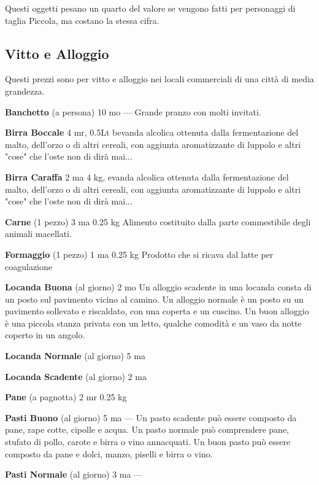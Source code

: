 \documentclass[a4paper,11pt,twoside,openany]{book}
\begin{document}
{Questi oggetti pesano un quarto del valore se vengono fatti per personaggi di taglia Piccola, ma costano la stessa cifra.

\pagebreak

\subsection{Vitto e Alloggio}

\label{vitto-e-alloggio}

Questi prezzi sono per vitto e alloggio nei locali commerciali di una città di media grandezza.

\textbf{Banchetto} (a persona) 10 mo --- Grande pranzo con molti invitati.

\textbf{Birra Boccale} 4 mr, 0.5Lt bevanda alcolica ottenuta dalla fermentazione del malto, dell'orzo o di altri cereali, con aggiunta aromatizzante di luppolo e altri "cose" che l'oste non di dirà mai...

\textbf{Birra Caraffa} 2 ma 4 kg, evanda alcolica ottenuta dalla fermentazione del malto, dell'orzo o di altri cereali, con aggiunta aromatizzante di luppolo e altri "cose" che l'oste non di dirà mai...

\textbf{Carne} (1 pezzo) 3 ma 0.25 kg Alimento costituito dalla parte commestibile degli animali macellati.

\textbf{Formaggio} (1 pezzo) 1 ma 0.25 kg Prodotto che si ricava dal latte per coagulazione

\textbf{Locanda Buona} (al giorno) 2 mo Un alloggio scadente in una locanda consta di un posto sul pavimento vicino al camino. Un alloggio normale è un posto su un pavimento sollevato e riscaldato, con una coperta e un cuscino. Un buon alloggio è una piccola stanza privata con un letto, qualche comodità e un vaso da notte coperto in un angolo.

\textbf{Locanda Normale} (al giorno) 5 ma

\textbf{Locanda Scadente} (al giorno) 2 ma 

\textbf{Pane} (a pagnotta) 2 mr 0.25 kg

\textbf{Pasti Buono} (al giorno) 5 ma --- Un pasto scadente può essere composto da pane, rape cotte, cipolle e acqua. Un pasto normale può comprendere pane, stufato di pollo, carote e birra o vino annacquati. Un buon pasto può essere composto da pane e dolci, manzo, piselli e birra o vino.

\textbf{Pasti Normale} (al giorno) 3 ma ---

}
\end{document}
